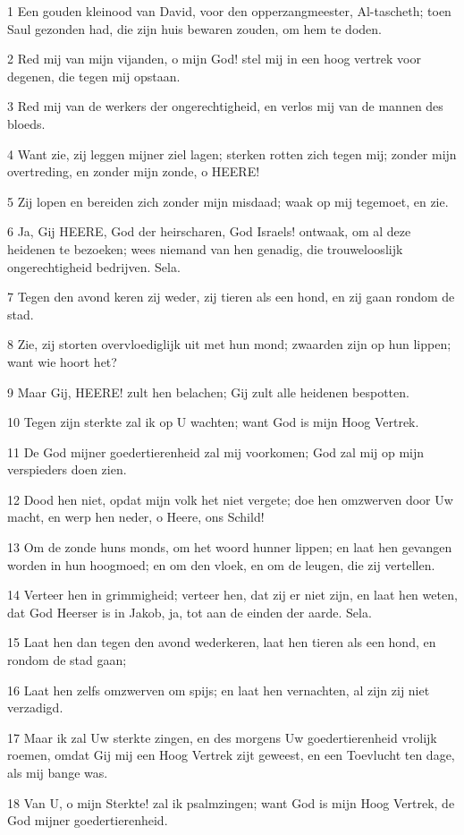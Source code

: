 \par 1 Een gouden kleinood van David, voor den opperzangmeester, Al-tascheth; toen Saul gezonden had, die zijn huis bewaren zouden, om hem te doden.
\par 2 Red mij van mijn vijanden, o mijn God! stel mij in een hoog vertrek voor degenen, die tegen mij opstaan.
\par 3 Red mij van de werkers der ongerechtigheid, en verlos mij van de mannen des bloeds.
\par 4 Want zie, zij leggen mijner ziel lagen; sterken rotten zich tegen mij; zonder mijn overtreding, en zonder mijn zonde, o HEERE!
\par 5 Zij lopen en bereiden zich zonder mijn misdaad; waak op mij tegemoet, en zie.
\par 6 Ja, Gij HEERE, God der heirscharen, God Israels! ontwaak, om al deze heidenen te bezoeken; wees niemand van hen genadig, die trouwelooslijk ongerechtigheid bedrijven. Sela.
\par 7 Tegen den avond keren zij weder, zij tieren als een hond, en zij gaan rondom de stad.
\par 8 Zie, zij storten overvloediglijk uit met hun mond; zwaarden zijn op hun lippen; want wie hoort het?
\par 9 Maar Gij, HEERE! zult hen belachen; Gij zult alle heidenen bespotten.
\par 10 Tegen zijn sterkte zal ik op U wachten; want God is mijn Hoog Vertrek.
\par 11 De God mijner goedertierenheid zal mij voorkomen; God zal mij op mijn verspieders doen zien.
\par 12 Dood hen niet, opdat mijn volk het niet vergete; doe hen omzwerven door Uw macht, en werp hen neder, o Heere, ons Schild!
\par 13 Om de zonde huns monds, om het woord hunner lippen; en laat hen gevangen worden in hun hoogmoed; en om den vloek, en om de leugen, die zij vertellen.
\par 14 Verteer hen in grimmigheid; verteer hen, dat zij er niet zijn, en laat hen weten, dat God Heerser is in Jakob, ja, tot aan de einden der aarde. Sela.
\par 15 Laat hen dan tegen den avond wederkeren, laat hen tieren als een hond, en rondom de stad gaan;
\par 16 Laat hen zelfs omzwerven om spijs; en laat hen vernachten, al zijn zij niet verzadigd.
\par 17 Maar ik zal Uw sterkte zingen, en des morgens Uw goedertierenheid vrolijk roemen, omdat Gij mij een Hoog Vertrek zijt geweest, en een Toevlucht ten dage, als mij bange was.
\par 18 Van U, o mijn Sterkte! zal ik psalmzingen; want God is mijn Hoog Vertrek, de God mijner goedertierenheid.

